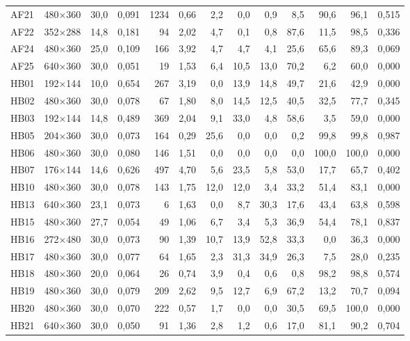 \begin{table}[htbp]
\begin{tabular}{lllrrrrrrrrrr}
AF21 & 480$\times$360 & 30,0 & 0,091 & 1234 & 0,66 & 2,2 & 0,0 & 0,9 & 8,5 & 90,6 & 96,1 & 0,515 \\
AF22 & 352$\times$288 & 14,8 & 0,181 & 94 & 2,02 & 4,7 & 0,1 & 0,8 & 87,6 & 11,5 & 98,5 & 0,336 \\
AF24 & 480$\times$360 & 25,0 & 0,109 & 166 & 3,92 & 4,7 & 4,7 & 4,1 & 25,6 & 65,6 & 89,3 & 0,069 \\
AF25 & 640$\times$360 & 30,0 & 0,051 & 19 & 1,53 & 6,4 & 10,5 & 13,0 & 70,2 & 6,2 & 60,0 & 0,000 \\
HB01 & 192$\times$144 & 10,0 & 0,654 & 267 & 3,19 & 0,0 & 13,9 & 14,8 & 49,7 & 21,6 & 42,9 & 0,000 \\
HB02 & 480$\times$360 & 30,0 & 0,078 & 67 & 1,80 & 8,0 & 14,5 & 12,5 & 40,5 & 32,5 & 77,7 & 0,345 \\
HB03 & 192$\times$144 & 14,8 & 0,489 & 369 & 2,04 & 9,1 & 33,0 & 4,8 & 58,6 & 3,5 & 59,0 & 0,000 \\
HB05 & 204$\times$360 & 30,0 & 0,073 & 164 & 0,29 & 25,6 & 0,0 & 0,0 & 0,2 & 99,8 & 99,8 & 0,987 \\
HB06 & 480$\times$360 & 30,0 & 0,080 & 146 & 1,51 & 0,0 & 0,0 & 0,0 & 0,0 & 100,0 & 100,0 & 0,000 \\
HB07 & 176$\times$144 & 14,6 & 0,626 & 497 & 4,70 & 5,6 & 23,5 & 5,8 & 53,0 & 17,7 & 65,7 & 0,402 \\
HB10 & 480$\times$360 & 30,0 & 0,078 & 143 & 1,75 & 12,0 & 12,0 & 3,4 & 33,2 & 51,4 & 83,1 & 0,000 \\
HB13 & 640$\times$360 & 23,1 & 0,073 & 6 & 1,63 & 0,0 & 8,7 & 30,3 & 17,6 & 43,4 & 63,8 & 0,598 \\
HB15 & 480$\times$360 & 27,7 & 0,054 & 49 & 1,06 & 6,7 & 3,4 & 5,3 & 36,9 & 54,4 & 78,1 & 0,837 \\
HB16 & 272$\times$480 & 30,0 & 0,073 & 90 & 1,39 & 10,7 & 13,9 & 52,8 & 33,3 & 0,0 & 36,3 & 0,000 \\
HB17 & 480$\times$360 & 30,0 & 0,077 & 64 & 1,65 & 2,3 & 31,3 & 34,9 & 26,3 & 7,5 & 28,0 & 0,235 \\
HB18 & 480$\times$360 & 20,0 & 0,064 & 26 & 0,74 & 3,9 & 0,4 & 0,6 & 0,8 & 98,2 & 98,8 & 0,574 \\
HB19 & 480$\times$360 & 30,0 & 0,079 & 209 & 2,62 & 9,5 & 12,7 & 6,9 & 67,2 & 13,2 & 70,7 & 0,094 \\
HB20 & 480$\times$360 & 30,0 & 0,070 & 222 & 0,57 & 1,7 & 0,0 & 0,0 & 30,5 & 69,5 & 100,0 & 0,000 \\
HB21 & 640$\times$360 & 30,0 & 0,050 & 91 & 1,36 & 2,8 & 1,2 & 0,6 & 17,0 & 81,1 & 90,2 & 0,704 \\

\end{tabular}
\end{table}
